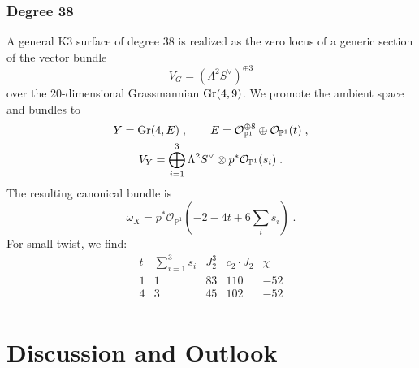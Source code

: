 \documentclass[11pt,a4paper]{article}
\numberwithin{equation}{section}
\numberwithin{table}{section}\setlength{\multlinegap}{25pt}
\begin{document}
\subsubsection*{Degree 38}

A general K3 surface of degree 38 is realized as the zero locus of a generic section of the vector bundle~\cite{debarre2020hyperkahler}
\begin{equation}
    \label{eq:Degree38FiberDefiningBundle}
    V_G=(\Lambda^2S^\vee)^{\oplus 3}
\end{equation}
over the 20-dimensional Grassmannian $\textup{Gr}(4,9)$. We promote the ambient space and bundles to
\begin{equation}
    \begin{gathered}
    Y = \textup{Gr}(4,E)\;,\qquad E = \mathcal{O}_{\mathbb{P}^1}^{\oplus 8}\oplus \mathcal{O}_{\mathbb{P}^1}(t)\;,\\
    V_Y=\bigoplus_{i=1}^3\Lambda^2S^\vee\otimes p^*\mathcal{O}_{\mathbb{P}^1}(s_i)\;.
    \end{gathered}
\end{equation}
The resulting canonical bundle is
\begin{equation}
    \omega_X=p^*\mathcal{O}_{\mathbb{P}^1}(-2-4t+6\textstyle{\sum}_i s_i)\;.
\end{equation}
For small twist, we find:
\begin{equation}
    \begin{array}{ccccc}
        t & \textstyle{\sum}_{i=1}^3s_i & J_2^3 & c_2\cdot J_2 & \chi\\
        \hline
        1 & 1 & 83 & 110 & -52\\
        4 & 3 & 45 & 102 & -52\\
    \end{array}
\end{equation}

\section{Discussion and Outlook}
\label{sec:Conclusions}
\end{document}

